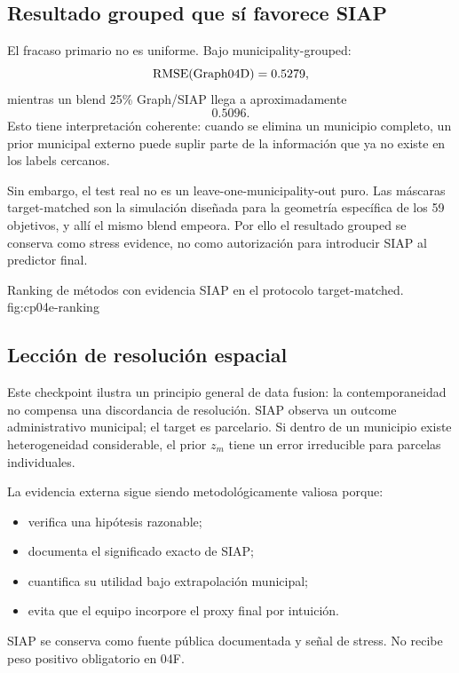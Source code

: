 \subsection{Resultado grouped que sí favorece SIAP}

El fracaso primario no es uniforme. Bajo municipality-grouped:
\[
\operatorname{RMSE}(\mathrm{Graph04D})=0.5279,
\]
mientras un blend 25\% Graph/SIAP llega a aproximadamente
\[
0.5096.
\]
Esto tiene interpretación coherente: cuando se elimina un municipio completo, un prior
municipal externo puede suplir parte de la información que ya no existe en los labels
cercanos.

Sin embargo, el test real no es un leave-one-municipality-out puro. Las máscaras
target-matched son la simulación diseñada para la geometría específica de los 59 objetivos, y
allí el mismo blend empeora. Por ello el resultado grouped se conserva como stress evidence,
no como autorización para introducir SIAP al predictor final.

{Ranking de métodos con evidencia SIAP en el protocolo target-matched.}
{fig:cp04e-ranking}

\subsection{Lección de resolución espacial}

Este checkpoint ilustra un principio general de data fusion: la contemporaneidad no compensa
una discordancia de resolución. SIAP observa un outcome administrativo municipal; el target es
parcelario. Si dentro de un municipio existe heterogeneidad considerable, el prior
$z_m$ tiene un error irreducible para parcelas individuales.

La evidencia externa sigue siendo metodológicamente valiosa porque:
\begin{itemize}
\item verifica una hipótesis razonable;
\item documenta el significado exacto de SIAP;
\item cuantifica su utilidad bajo extrapolación municipal;
\item evita que el equipo incorpore el proxy final por intuición.
\end{itemize}

\begin{decision}
SIAP se conserva como fuente pública documentada y señal de stress. No recibe peso positivo
obligatorio en 04F.
\end{decision}
